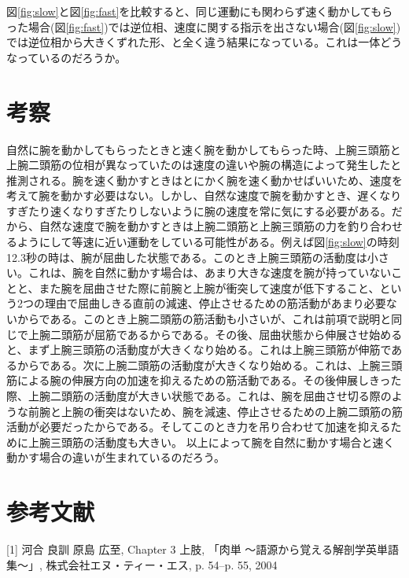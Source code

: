 \documentclass{jsarticle}
\begin{document}
図\ref{fig:slow}と図\ref{fig:fast}を比較すると、同じ運動にも関わらず速く動かしてもらった場合(図\ref{fig:fast})では逆位相、速度に関する指示を出さない場合(図\ref{fig:slow})では逆位相から大きくずれた形、と全く違う結果になっている。これは一体どうなっているのだろうか。

\section{考察}
自然に腕を動かしてもらったときと速く腕を動かしてもらった時、上腕三頭筋と上腕二頭筋の位相が異なっていたのは速度の違いや腕の構造によって発生したと推測される。腕を速く動かすときはとにかく腕を速く動かせばいいため、速度を考えて腕を動かす必要はない。しかし、自然な速度で腕を動かすとき、遅くなりすぎたり速くなりすぎたりしないように腕の速度を常に気にする必要がある。だから、自然な速度で腕を動かすときは上腕二頭筋と上腕三頭筋の力を釣り合わせるようにして等速に近い運動をしている可能性がある。例えば図\ref{fig:slow}の時刻12.3秒の時は、腕が屈曲した状態である。このとき上腕三頭筋の活動度は小さい。これは、腕を自然に動かす場合は、あまり大きな速度を腕が持っていないことと、また腕を屈曲させた際に前腕と上腕が衝突して速度が低下すること、という2つの理由で屈曲しきる直前の減速、停止させるための筋活動があまり必要ないからである。このとき上腕二頭筋の筋活動も小さいが、これは前項で説明と同じで上腕二頭筋が屈筋であるからである。その後、屈曲状態から伸展させ始めると、まず上腕三頭筋の活動度が大きくなり始める。これは上腕三頭筋が伸筋であるからである。次に上腕二頭筋の活動度が大きくなり始める。これは、上腕三頭筋による腕の伸展方向の加速を抑えるための筋活動である。その後伸展しきった際、上腕二頭筋の活動度が大きい状態である。これは、腕を屈曲させ切る際のような前腕と上腕の衝突はないため、腕を減速、停止させるための上腕二頭筋の筋活動が必要だったからである。そしてこのとき力を吊り合わせて加速を抑えるために上腕三頭筋の活動度も大きい。
以上によって腕を自然に動かす場合と速く動かす場合の違いが生まれているのだろう。

\section*{参考文献}
[1] 河合 良訓 原島 広至, Chapter 3 上肢, 「肉単 〜語源から覚える解剖学英単語集〜」, 株式会社エヌ・ティー・エス, p. 54--p. 55, 2004
\end{document}

